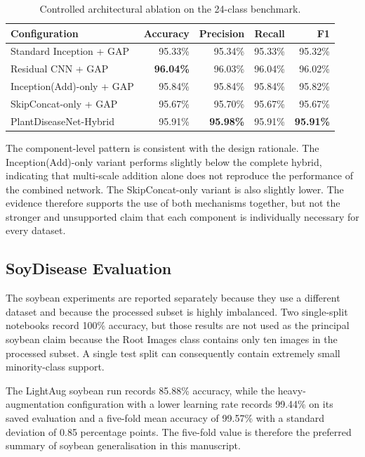 \documentclass[a4paper,fleqn]{cas-dc}
\begin{document}
\begin{table}[!t]
\centering
\caption{Controlled architectural ablation on the 24-class benchmark.}
\label{tab:ablation}
\small
\begin{tabular}{p{4.0cm}rrrr}
\toprule
Configuration & Accuracy & Precision & Recall & F1 \\
\midrule
Standard Inception + GAP & 95.33\% & 95.34\% & 95.33\% & 95.32\% \\
Residual CNN + GAP & \textbf{96.04\%} & 96.03\% & 96.04\% & 96.02\% \\
Inception(Add)-only + GAP & 95.84\% & 95.84\% & 95.84\% & 95.82\% \\
SkipConcat-only + GAP & 95.67\% & 95.70\% & 95.67\% & 95.67\% \\
PlantDiseaseNet-Hybrid & 95.91\% & \textbf{95.98\%} & 95.91\% & \textbf{95.91\%} \\
\bottomrule
\end{tabular}
\end{table}

The component-level pattern is consistent with the design rationale. The Inception(Add)-only variant performs slightly below the complete hybrid, indicating that multi-scale addition alone does not reproduce the performance of the combined network. The SkipConcat-only variant is also slightly lower. The evidence therefore supports the use of both mechanisms together, but not the stronger and unsupported claim that each component is individually necessary for every dataset.

\subsection{SoyDisease Evaluation}
The soybean experiments are reported separately because they use a different dataset and because the processed subset is highly imbalanced. Two single-split notebooks record 100\% accuracy, but those results are not used as the principal soybean claim because the Root Images class contains only ten images in the processed subset. A single test split can consequently contain extremely small minority-class support.

The LightAug soybean run records 85.88\% accuracy, while the heavy-augmentation configuration with a lower learning rate records 99.44\% on its saved evaluation and a five-fold mean accuracy of 99.57\% with a standard deviation of 0.85 percentage points. The five-fold value is therefore the preferred summary of soybean generalisation in this manuscript.
\end{document}
